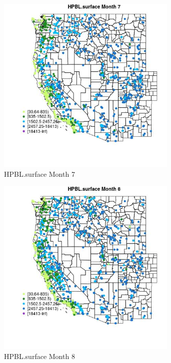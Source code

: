 \begin{figure} 
\centering  
\includegraphics[width=0.77\textwidth]{Code_Outputs/Report_ML_input_PM25_Step4_part_f_de_duplicated_aveswNAs_MapObsMo7HPBLsurface.jpg} 
\caption{\label{fig:Report_ML_input_PM25_Step4_part_f_de_duplicated_aveswNAsMapObsMo7HPBLsurface}HPBL.surface Month 7} 
\end{figure} 
 

\begin{figure} 
\centering  
\includegraphics[width=0.77\textwidth]{Code_Outputs/Report_ML_input_PM25_Step4_part_f_de_duplicated_aveswNAs_MapObsMo8HPBLsurface.jpg} 
\caption{\label{fig:Report_ML_input_PM25_Step4_part_f_de_duplicated_aveswNAsMapObsMo8HPBLsurface}HPBL.surface Month 8} 
\end{figure} 
 

